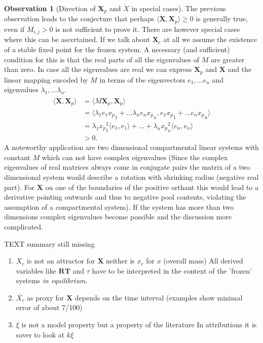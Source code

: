 \documentclass[journal abbreviation, manuscript]{copernicus}
\theoremstyle{definition}
\newtheorem{observation}{Observation}[section]
\newcommand{\X}{\mathbf{X}}
\newcommand{\RT}{\mathbf{RT}}
\begin{document}
\begin{observation}[Direction of $\X_p$ and $\dot{X}$ in special cases]
The previous observation leads to the conjecture that perhaps $\langle \dot{\X},\X_p \rangle \ge 0$ is generally true, even if $M_{i,j} > 0 $ is not sufficient to prove it.
There are however special cases where this can be ascertained.
If we talk about $\X_c$ at all we assume the existence of a stable fixed point for the frozen system. A necessary (and sufficient) condition for this is that the real parts of all the eigenvalues of $M$ are greater than zero. 
In case all the eigenvalues are real we can express $\X_p$ and $\dot{\X}$ and the linear mapping encoded by $M$ in terms of tbe eigenvectors $e_1,\dots e_n$ and eigenvalues $\lambda_1, \dots \lambda_n$.
\begin{align}
\langle \dot{\X},\X_p  \rangle 
&=
\langle M \X_p,\X_p  \rangle \\
&=
\langle 
  \lambda_1 e_1 {x_p}_1+\dots \lambda_n e_n {x_p}_n , 
  e_1 {x_p}_1+\dots e_n {x_p}_n
\rangle 
\\
&=
\lambda_1 {x_p}_1^2 \langle e_1,e_1 \rangle
+\dots +
\lambda_n{x_p}_n^2 \langle e_n,e_n \rangle
\\
&> 0.
\end{align}
A noteworthy application are two dimensional compartmental linear systems with constant $M$ which can not have complex eigenvalues (Since the complex eigenvalues of real matrices always come in conjugate pairs the matrix of a two dimensional system would describe a rotation with shrinking radius (negative real part). For $\X$ on one of the boundaries of the positive orthant this would lead to a derivative pointing outwards and thus to negative pool contents, violating the assumption of a compartmental system).
If the system has more than two dimensions complex eigenvalues become possible and the discussion more complicated.
\end{observation}


\conclusions  %
TEXT
{\color{red} summary still missing}

\begin{enumerate}
\item
$X_c$ is not an attractor for $\X$ neither is $x_c$ for $x$ (overall mass)
All derived variables like $\RT$ and $\tau$ have to be interpreted in the context of the 'frozen' systems \emph{in equilibrium}.
\item
$\bar{X_c}$ as proxy for $\X$ depends on the time interval (examples show minimal error of about 7/100)
\item
$\xi$ is not a model property but a property of the literature
In attributions it is saver to look at $k \xi$ 


\end{enumerate}
\end{document}
